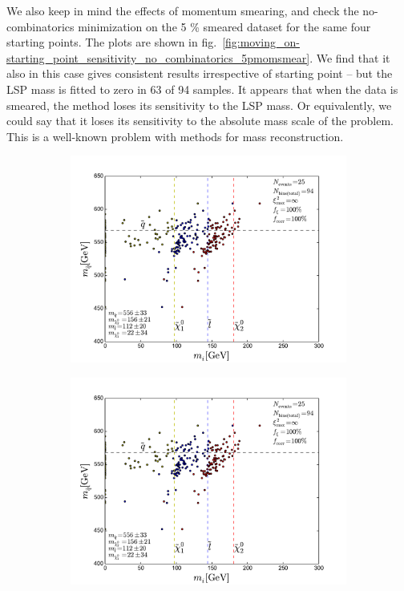 \documentclass[twoside,english]{uiofysmaster}
\begin{document}
We also keep in mind the effects of momentum smearing, and check the no-combinatorics minimization on the 5 \% smeared dataset for the same four starting points. The plots are shown in fig.\ \ref{fig:moving_on-starting_point_sensitivity_no_combinatorics_5pmomsmear}. We find that it also in this case gives consistent results irrespective of starting point -- but the LSP mass is fitted to zero in 63 of 94 samples. It appears that when the data is smeared, the method loses its sensitivity to the LSP mass. Or equivalently, we could say that it loses its sensitivity to the absolute mass scale of the problem. This is a well-known problem with methods for mass reconstruction.
\begin{figure}[hbt]
	\centering
	\begin{subfigure}[b]{0.45\textwidth}
		\includegraphics[width=\textwidth]{figures/improving_combinatorics/herwigpp_5psmear_lowtol_nocomb_TMP.pdf} 
		\caption{ }
	\end{subfigure}
	\begin{subfigure}[b]{0.45\textwidth}
		\includegraphics[width=\textwidth]{figures/improving_combinatorics/herwigpp_5psmear_lowtol_nocomb_400-300-200-100.pdf}
		\caption{ } 
	\end{subfigure}


\end{figure}
\end{document}

